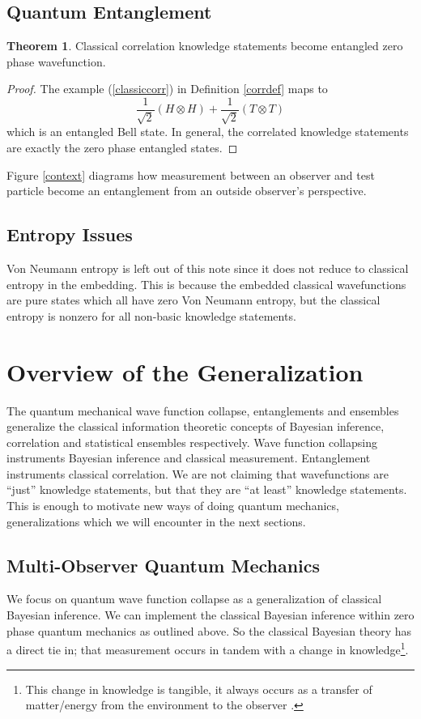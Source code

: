 \documentclass[12pt,a4paper]{article}
\theoremstyle{myrule}
\theoremstyle{postulate}
\theoremstyle{definition}
\newtheorem{theorem}{Theorem}[section]
\begin{document}
\subsection{Quantum Entanglement}
\label{entangle}
\begin{theorem}
  Classical correlation knowledge statements become entangled zero phase wavefunction.
\end{theorem}
\begin{proof}
  The example (\ref{classiccorr}) in Definition \ref{corrdef} maps to
 \begin{equation}
  \label{bell}
  \frac{1}{\sqrt{2}} (H \otimes H) + \frac{1}{\sqrt{2}} (T \otimes T)
\end{equation}
which is an entangled Bell state.  In general, the correlated knowledge statements are exactly the zero phase entangled states.
\end{proof}

Figure \ref{context} diagrams how measurement between an observer and test particle become an entanglement from an outside observer's perspective.

\subsection{Entropy Issues}
Von Neumann entropy is left out of this note since it does not reduce to classical entropy in the embedding.  This is because the embedded classical wavefunctions are pure states which all have zero Von Neumann entropy, but the classical entropy is nonzero for all non-basic knowledge statements.

\section{Overview of the Generalization}

The quantum mechanical wave function collapse, entanglements and ensembles generalize the classical information theoretic concepts of Bayesian inference, correlation and statistical ensembles respectively.  Wave function collapsing instruments Bayesian inference and classical measurement.  Entanglement instruments classical correlation.  We are not claiming that wavefunctions are ``just'' knowledge statements, but that they are ``at least'' knowledge statements.  This is enough to motivate new ways of doing quantum mechanics, generalizations which we will encounter in the next sections.

\subsection{Multi-Observer Quantum Mechanics}
We focus on quantum wave function collapse as a generalization of classical Bayesian inference.  We can implement the classical Bayesian inference within zero phase quantum mechanics as outlined above.  So the classical Bayesian theory has a direct tie in; that measurement occurs in tandem with a change in knowledge\footnote{This change in knowledge is tangible, it always occurs as a transfer of matter/energy from the environment to the observer \cite{thrust}.}.  
\end{document}

